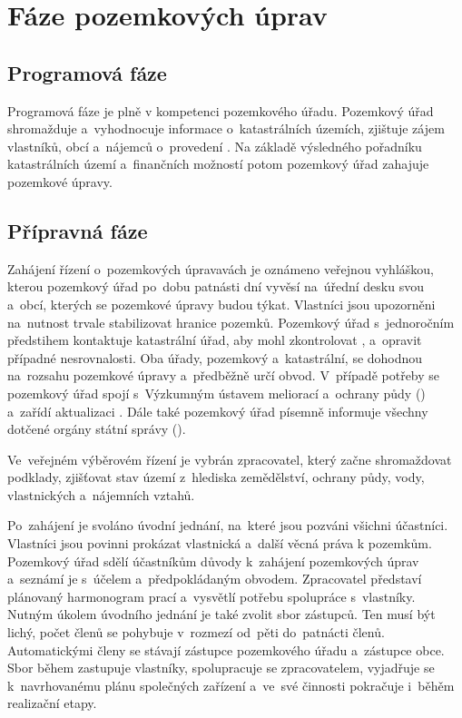 \section{Fáze pozemkových úprav}
\label{etapy_pu}

\subsection{Programová fáze}
\label{programova_faze}

Programová fáze je plně v kompetenci pozemkového úřadu. Pozemkový úřad shromažduje a~vyhodnocuje informace o~katastrálních územích, zjištuje zájem vlastníků, obcí a~nájemců o~provedení . Na základě výsledného pořadníku katastrálních území a~finančních možností potom pozemkový úřad zahajuje pozemkové úpravy.

\subsection{Přípravná fáze}
\label{pripravna_faze}

Zahájení řízení o~pozemkových úpravavách je oznámeno veřejnou vyhláškou, kterou pozemkový úřad po~dobu patnásti dní vyvěsí na~úřední desku svou a~obcí, kterých se pozemkové úpravy budou týkat. Vlastníci jsou upozorněni na~nutnost trvale stabilizovat hranice pozemků. Pozemkový úřad s~jednoročním předstihem kontaktuje katastrální úřad, aby mohl zkontrolovat ,  a~opravit případné nesrovnalosti. Oba úřady, pozemkový a~katastrální, se dohodnou na~rozsahu pozemkové úpravy a~předběžně určí obvod. V~případě potřeby se pozemkový úřad spojí s~Výzkumným ústavem meliorací a~ochrany půdy () a~zařídí aktualizaci . Dále také pozemkový úřad písemně informuje všechny dotčené orgány státní správy ().

Ve~veřejném výběrovém řízení je vybrán zpracovatel, který začne shromaždovat podklady, zjišťovat stav území z~hlediska zemědělství, ochrany půdy, vody, vlastnických a~nájemních vztahů.

Po~zahájení  je svoláno úvodní jednání, na~které jsou pozváni všichni účastníci. Vlastníci jsou povinni prokázat vlastnická a~další věcná práva k pozemkům. Pozemkový úřad sdělí účastníkům důvody k~zahájení pozemkových úprav a~seznámí je s~účelem a~předpokládaným obvodem. Zpracovatel představí plánovaný harmonogram prací a~vysvětlí potřebu spolupráce s~vlastníky. Nutným úkolem úvodního jednání je také zvolit sbor zástupců. Ten musí být lichý, počet členů se pohybuje v~rozmezí od~pěti do~patnácti členů. Automatickými členy se stávají zástupce pozemkového úřadu a~zástupce obce. Sbor během  zastupuje vlastníky, spolupracuje se zpracovatelem, vyjadřuje se k~navrhovanému plánu společných zařízení a~ve~své činnosti pokračuje i~běhěm realizační etapy.

